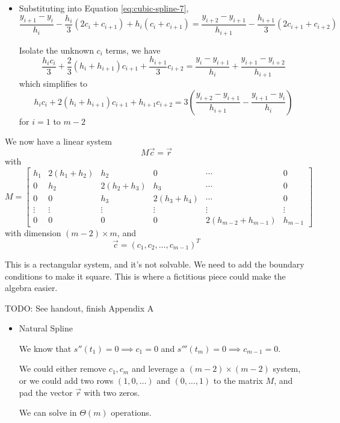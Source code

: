 \begin{itemize}
\begin{itemize}
              \item Substituting into Equation \ref{eq:cubic-spline-7}, \[
                        \frac{y_{i+1} - y_i}{h_i} - \frac{h_i}{3} (2c_i + c_{i+1}) + h_i(c_i + c_{i+1}) = \frac{y_{i+2} - y_{i+1}}{h_{i+1}} - \frac{h_{i+1}}{3} (2c_{i+1} + c_{i+2})
                    \]

                    Isolate the unknown \( c_i \) terms, we have \[
                        \frac{h_i c_i}{3} + \frac{2}{3} (h_i + h_{i+1}) c_{i+1} + \frac{h_{i+1}}{3} c_{i+2} = \frac{y_{i} - y_{i+1}}{h_i} + \frac{y_{i+1} - y_{i+2}}{h_{i+1}}
                    \] which simplifies to \begin{equation}\label{eq:cubic-spline-8}
                        h_i c_i + 2(h_i + h_{i+1}) c_{i+1} + h_{i+1} c_{i+2} = 3 \left( \frac{y_{i+2} - y_{i+1}}{h_{i+1}} - \frac{y_{i+1} - y_i}{h_i} \right)
                    \end{equation} for \( i = 1 \) to \( m - 2 \)
          \end{itemize}
\end{itemize}

We now have a linear system \[
    M \vec{c} = \vec{r}
\] with \[
    M = \begin{bmatrix}
        h_1    & 2(h_1 + h_2) & h_2          & 0            & \cdots               & 0       \\
        0      & h_2          & 2(h_2 + h_3) & h_3          & \cdots               & 0       \\
        0      & 0            & h_3          & 2(h_3 + h_4) & \cdots               & 0       \\
        \vdots & \vdots       & \vdots       & \vdots       & \vdots               & \vdots  \\
        0      & 0            & 0            & 0            & 2(h_{m-2} + h_{m-1}) & h_{m-1}
    \end{bmatrix}
\] with dimension \( (m - 2) \times m \), and \[
    \vec{c} = (c_1, c_2, \ldots, c_{m-1})^T
\]

This is a rectangular system, and it's not solvable. We need to add the boundary conditions to make it square. This is where a fictitious piece could make the algebra easier.

TODO: See handout, finish Appendix A

\begin{itemize}
    \item Natural Spline

          We know that \( s''(t_1) = 0 \implies c_1 = 0 \) and \( s'''(t_m) = 0 \implies c_{m-1} = 0 \).

          We could either remove \( c_1, c_m \) and leverage a \( (m - 2) \times (m - 2) \) system, or we could add two rows \( (1, 0, \dots) \) and \( (0, \dots, 1) \) to the matrix \( M \), and pad the vector \( \vec{r} \) with two zeros.

          We can solve in \( \Theta(m) \) operations.
\end{itemize}
